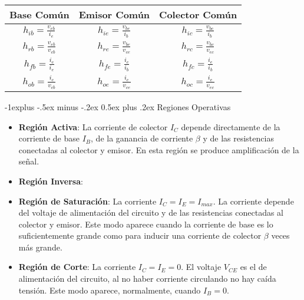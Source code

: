 \documentclass[10pt,landscape]{article}
\makeatletter
\renewcommand{\subsection}{\@startsection{subsection}{2}{0mm}%
                                {-1explus -.5ex minus -.2ex}%
                                {0.5ex plus .2ex}%
                                {\normalfont\normalsize\bfseries}}
\makeatother
\begin{document}
\begin{multicols}{3}
\begin{tabular}{| c | c | c |}
\hline
Base Común                              & Emisor Común & Colector Común \\ \hline
    $\displaystyle h_{ib} = \frac{v_{eb}}{i_e}$       &  $\displaystyle h_{ie} = \frac{v_{be}}{i_b}$            &   $\displaystyle h_{ic} = \frac{v_{bc}}{i_b}$             \\ \hline
    $\displaystyle h_{rb} = \frac{v_{eb}}{v_{cb}}$   &   $\displaystyle h_{re} = \frac{v_{be}}{v_{ce}}$           &   $\displaystyle h_{rc} = \frac{v_{bc}}{v_{ec}}$             \\ \hline
    $\displaystyle h_{fb} = \frac{i_c}{i_e}$       &  $\displaystyle h_{fe} = \frac{i_{c}}{i_{b}} $            &    $\displaystyle h_{fc} = \frac{i_{e}}{i_{b}}$            \\ \hline
     $\displaystyle h_{ob} = \frac{i_c}{v_{cb}}$      &       $\displaystyle h_{oe} = \frac{i_{c}}{v_{ce}}$       &     $\displaystyle h_{oc} = \frac{i_{e}}{v_{ec}}$           \\ \hline
\end{tabular}

\subsection{Regiones Operativas}

	\begin{center}
	\end{center}

\begin{itemize}
	\item \textbf{Región Activa}: La corriente de colector $I_C$ depende directamente de la corriente de base $I_B$, de la ganancia de corriente $\beta$ y de las resistencias conectadas al colector y emisor. En esta región se produce amplificación de la señal.
	\item \textbf{Región Inversa}: 
	\item \textbf{Región de Saturación}: La corriente $I_C = I_E = I_{max}$. La corriente depende del voltaje de alimentación del circuito y de las resistencias conectadas al colector y emisor. Este modo aparece cuando la corriente de base es lo suficientemente grande como para inducir una corriente de colector $\beta$ veces más grande.
	\item \textbf{Región de Corte}: La corriente $I_C = I_E = 0$. El voltaje $V_{CE}$ es el de alimentación del circuito, al no haber corriente circulando no hay caí­da tensión. Este modo aparece, normalmente, cuando $I_B = 0$.
\end{itemize}


\end{multicols}
\end{document}
